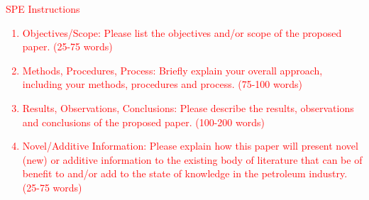 \documentclass{article}
\newcommand{\red}{\textcolor{red}}
\begin{document}
\red{\begin{center}\large{SPE Instructions}\end{center}
\begin{enumerate}
  \item Objectives/Scope: Please list the objectives and/or scope of the proposed paper. (25-75 words)
  \item Methods, Procedures, Process: Briefly explain your overall approach, including your methods, procedures and process. (75-100 words)
  \item Results, Observations, Conclusions: Please describe the results, observations and conclusions of the proposed paper. (100-200 words)
  \item Novel/Additive Information: Please explain how this paper will present novel (new) or additive information to the existing body of literature that can be of benefit to and/or add to the state of knowledge in the petroleum industry. (25-75 words) 
\end{enumerate}}
\end{document}
